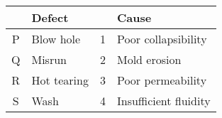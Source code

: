 \begin{tabular}{|c|l|c|l|}
    \hline
    \textbf{} & \textbf{Defect} & \textbf{} & \textbf{Cause} \\
    \hline
    P & Blow hole & 1 & Poor collapsibility \\
    Q & Misrun & 2 & Mold erosion \\
    R & Hot tearing & 3 & Poor permeability \\
    S & Wash & 4 & Insufficient fluidity \\
    \hline
    \end{tabular}